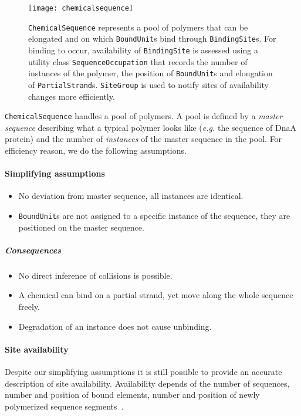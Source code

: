 \begin{figure}[!h]
  \centering
  \texttt{[image: chemicalsequence]}
  \caption{
  \texttt{ChemicalSequence} represents a pool of polymers that can be elongated
  and on which \texttt{BoundUnit}s bind through \texttt{BindingSite}s.
  For binding to occur, availability of \texttt{BindingSite} is assessed
  using a utility class \texttt{SequenceOccupation}
  that records the number of instances of the polymer,
  the position of \texttt{BoundUnit}s and elongation of \texttt{PartialStrand}s.
  \texttt{SiteGroup} is used to notify sites of availability changes more efficiently.}
\label{fig:det_chemical_sequence}
\end{figure}

\texttt{ChemicalSequence} handles a pool of polymers.
A pool is defined by a \emph{master sequence} describing what a typical polymer
looks like (\textit{e.g.} the sequence of DnaA protein)
and the number of \emph{instances} of the master sequence in the pool.
For efficiency reason, we do the following assumptions.

\paragraph{Simplifying assumptions}
\begin{itemize}
\item No deviation from master sequence, all instances are identical.
\item \texttt{BoundUnit}s are not assigned to a specific instance of the sequence,
they are positioned on the  master sequence.
\end{itemize}

\subparagraph{Consequences}
\begin{itemize}
\item No direct inference of collisions is possible.
\item A chemical can bind on a partial strand, yet move along the whole sequence freely.
\item Degradation of an instance does not cause unbinding.
\end{itemize}

\paragraph{Site availability}
Despite our simplifying assumptions it is still possible to provide
an accurate description of site availability.
Availability depends of the number of sequences, number and position of bound elements,
number and position of newly polymerized sequence segments~.


